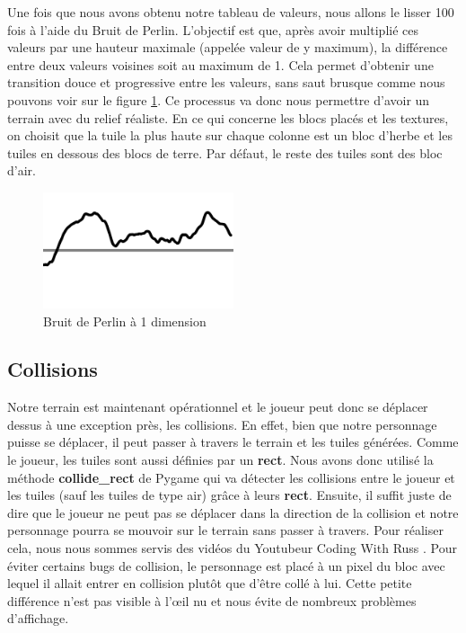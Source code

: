 \documentclass[12pt]{article}
\begin{document}
\newpage
Une fois que nous avons obtenu notre tableau de valeurs, nous allons le lisser 100 fois à l’aide du Bruit de Perlin. L’objectif est que, après avoir multiplié ces valeurs par une hauteur maximale (appelée valeur de y maximum), la différence entre deux valeurs voisines soit au maximum de 1. Cela permet d’obtenir une transition douce et progressive entre les valeurs, sans saut brusque comme nous pouvons voir sur le figure \ref{perlin1d}. Ce processus va donc nous permettre d'avoir un terrain avec du relief réaliste. En ce qui concerne les blocs placés et les textures, on choisit que la tuile la plus haute sur chaque colonne est un bloc d'herbe et les tuiles en dessous des blocs de terre. Par défaut, le reste des tuiles sont des bloc d'air.\par %
\begin{figure}[!h]
  \centering
  \includegraphics[width=0.5\textwidth]{assets/PerlinNoise1d.png}
  \caption{Bruit de Perlin à 1 dimension}
  \label{perlin1d}
\end{figure}

\subsection{Collisions}

Notre terrain est maintenant opérationnel et le joueur peut donc se déplacer dessus à une exception près, les collisions. En effet, bien que notre personnage puisse se déplacer, il peut passer à travers le terrain et les tuiles générées. Comme le joueur, les tuiles sont aussi définies par un \textbf{rect}. Nous avons donc utilisé la méthode \textbf{collide\_rect} de Pygame qui va détecter les collisions entre le joueur et les tuiles (sauf les tuiles de type air) grâce à leurs \textbf{rect}. Ensuite, il suffit juste de dire que le joueur ne peut pas se déplacer dans la direction de la collision et notre personnage pourra se mouvoir sur le terrain sans passer à travers. Pour réaliser cela, nous nous sommes servis des vidéos du Youtubeur Coding With Russ \cite{codingwithruss-channel}. Pour éviter certains bugs de collision, le personnage est placé à un pixel du bloc avec lequel il allait entrer en collision plutôt que d'être collé à lui. Cette petite différence n'est pas visible à l'œil nu et nous évite de nombreux problèmes d'affichage. \par
\end{document}
